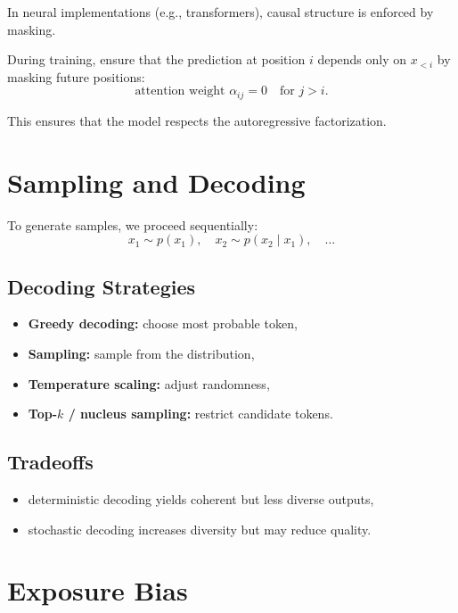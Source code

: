 In neural implementations (e.g., transformers), causal structure is enforced by masking.

\begin{definition}
During training, ensure that the prediction at position $i$ depends only on $x_{<i}$ by masking future positions:
\[
\text{attention weight } \alpha_{ij} = 0 \quad \text{for } j > i.
\]
\end{definition}

This ensures that the model respects the autoregressive factorization.

\section{Sampling and Decoding}

To generate samples, we proceed sequentially:
\[
x_1 \sim p(x_1),\quad
x_2 \sim p(x_2 \mid x_1),\quad
\dots
\]

\subsection{Decoding Strategies}

\begin{itemize}
    \item \textbf{Greedy decoding:} choose most probable token,
    \item \textbf{Sampling:} sample from the distribution,
    \item \textbf{Temperature scaling:} adjust randomness,
    \item \textbf{Top-$k$ / nucleus sampling:} restrict candidate tokens.
\end{itemize}

\subsection{Tradeoffs}

\begin{itemize}
    \item deterministic decoding yields coherent but less diverse outputs,
    \item stochastic decoding increases diversity but may reduce quality.
\end{itemize}

\section{Exposure Bias}

